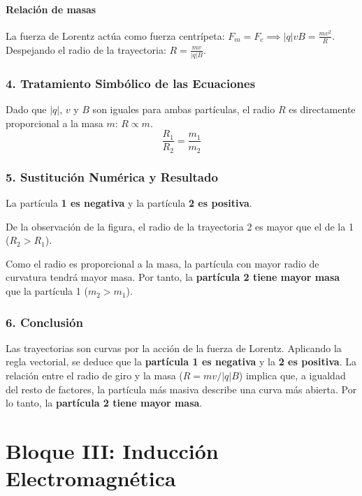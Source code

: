\paragraph*{Relación de masas}
La fuerza de Lorentz actúa como fuerza centrípeta: $F_m = F_c \implies |q|vB = \frac{mv^2}{R}$. Despejando el radio de la trayectoria: $R = \frac{mv}{|q|B}$.

\subsubsection*{4. Tratamiento Simbólico de las Ecuaciones}
Dado que $|q|$, $v$ y $B$ son iguales para ambas partículas, el radio $R$ es directamente proporcional a la masa $m$: $R \propto m$.
$$ \frac{R_1}{R_2} = \frac{m_1}{m_2} $$

\subsubsection*{5. Sustitución Numérica y Resultado}
\begin{cajaresultado}
    La partícula \textbf{1 es negativa} y la partícula \textbf{2 es positiva}.
\end{cajaresultado}
De la observación de la figura, el radio de la trayectoria 2 es mayor que el de la 1 ($R_2 > R_1$).
\begin{cajaresultado}
    Como el radio es proporcional a la masa, la partícula con mayor radio de curvatura tendrá mayor masa. Por tanto, la \textbf{partícula 2 tiene mayor masa} que la partícula 1 ($m_2 > m_1$).
\end{cajaresultado}

\subsubsection*{6. Conclusión}
\begin{cajaconclusion}
    Las trayectorias son curvas por la acción de la fuerza de Lorentz. Aplicando la regla vectorial, se deduce que la \textbf{partícula 1 es negativa} y la \textbf{2 es positiva}. La relación entre el radio de giro y la masa ($R=mv/|q|B$) implica que, a igualdad del resto de factores, la partícula más masiva describe una curva más abierta. Por lo tanto, la \textbf{partícula 2 tiene mayor masa}.
\end{cajaconclusion}

\newpage

\section{Bloque III: Inducción Electromagnética}
\label{sec:em_2025_jun_res_2}
